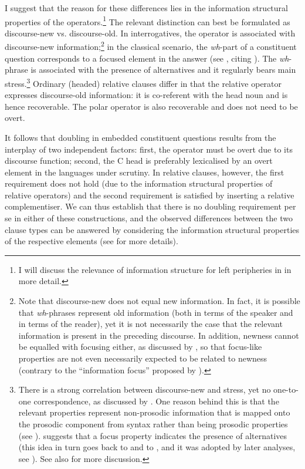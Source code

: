 I suggest that the reason for these differences lies in the information structural properties of the operators.\footnote{I will discuss the relevance of information structure for left peripheries in  in more detail.} The relevant distinction can best be formulated as discourse-new vs. discourse-old. In interrogatives, the operator is associated with discourse-new information;\footnote{Note that discourse-new does not equal new information. In fact, it is possible that \textit{wh}-phrases represent old information (both in terms of the speaker and in terms of the reader), yet it is not necessarily the case that the relevant information is present in the preceding discourse. In addition, newness cannot be equalled with focusing either, as discussed by \citet[255--257]{krifka2008}, so that focus-like properties are not even necessarily expected to be related to newness (contrary to the ``information focus'' proposed by \citealt{halliday1967}).} in the classical scenario, the \textit{wh}-part of a constituent question corresponds to a focused element in the answer (see \citealt[250]{krifka2008}, citing \citealt{paul1880}). The \textit{wh}-phrase is associated with the presence of alternatives and it regularly bears main stress.\footnote{There is a strong correlation between discourse-new and stress, yet no one-to-one correspondence, as discussed by \citet[874--876]{buering2013}. One reason behind this is that the relevant properties represent non-prosodic information that is mapped onto the prosodic component from syntax rather than being prosodic properties (see \citealt[860--861]{buering2013}). \citet[248]{krifka2008} suggests that a focus property indicates the presence of alternatives (this idea in turn goes back to \citealt{vonstechow1981} and to \citealt{rooth1985diss}, and it was adopted by later analyses, see \citealt{buering2013}). See also \citet[197--198]{bacskaiatkari2022jb} for more discussion.} Ordinary (headed) relative clauses differ in that the relative operator expresses discourse-old information: it is co-referent with the head noun and is hence recoverable. The polar operator is also recoverable and does not need to be overt.

It follows that doubling in embedded constituent questions results from the interplay of two independent factors: first, the operator must be overt due to its discourse function; second, the C head is preferably lexicalised by an overt element in the languages under scrutiny. In relative clauses, however, the first requirement does not hold (due to the information structural properties of relative operators) and the second requirement is satisfied by inserting a relative complementiser. We can thus establish that there is no doubling requirement per se in either of these constructions, and the observed differences between the two clause types can be answered by considering the information structural properties of the respective elements (see \citealt{bacskaiatkari2022jb} for more details).

